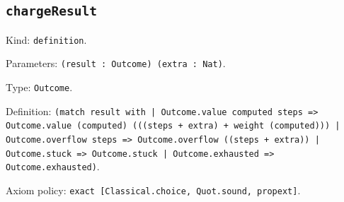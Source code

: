 \documentclass[11pt]{article}
\begin{document}
\subsection*{\texttt{chargeResult}}
\noindent Kind: \texttt{definition}.\par
\noindent Parameters: \texttt{(result : Outcome) (extra : Nat)}.\par
\noindent Type: \texttt{Outcome}.\par
\noindent Definition: \texttt{(match result with | Outcome.value computed steps => Outcome.value (computed) (((steps + extra) + weight (computed))) | Outcome.overflow steps => Outcome.overflow ((steps + extra)) | Outcome.stuck => Outcome.stuck | Outcome.exhausted => Outcome.exhausted)}.\par
\noindent Axiom policy: \texttt{exact [Classical.choice, Quot.sound, propext]}.\par
\end{document}
